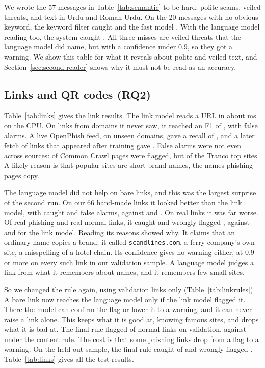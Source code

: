 We wrote the 57 messages in Table~\ref{tab:semantic} to be hard: polite scams, veiled threats, and text in Urdu and Roman Urdu. On the 20 messages with no obvious keyword, the keyword filter caught \plainKeyword{} and the fast model \plainFast{}. With the language model reading too, the system caught \plainBoth{}. All three misses are veiled threats that the language model did name, but with a confidence under 0.9, so they got a warning. We show this table for what it reveals about polite and veiled text, and Section~\ref{sec:second-reader} shows why it must not be read as an accuracy.

\subsection{Links and QR codes (RQ2)}
\label{sec:links}

Table~\ref{tab:links} gives the link results. The link model reads a URL in about \linkMs{} ms on the CPU. On \linkRows{} links from domains it never saw, it reached an F1 of \linkFone{}, with \linkFalseAlarm{} false alarms. A live OpenPhish feed, on unseen domains, gave a recall of \linkOpenphish{}, and a later fetch of links that appeared after training gave \linkOpenphishLater{}. False alarms were not even across sources: \linkCrawlFA{} of Common Crawl pages were flagged, but \linkTrancoFA{} of the Tranco top sites. A likely reason is that popular sites are short brand names, the names phishing pages copy.

The language model did not help on bare links, and this was the largest surprise of the second run. On our 66 hand-made links it looked better than the link model, with \fakeOldCaught{} caught and \fakeOldWrong{} false alarms, against \fakeLinkCaught{} and \fakeLinkWrong{}. On real links it was far worse. Of \linkSampleEach{} real phishing and \linkSampleEach{} real normal links, it caught \linkSampleCaught{} and wrongly flagged \linkSampleWrong{}, against \linkSampleFastCaught{} and \linkSampleFastWrong{} for the link model. Reading its reasons showed why. It claims that an ordinary name copies a brand: it called \texttt{scandlines.com}, a ferry company's own site, a misspelling of a hotel chain. Its confidence gives no warning either, at 0.9 or more on every such link in our validation sample. A language model judges a link from what it remembers about names, and it remembers few small sites.

So we changed the rule again, using validation links only (Table~\ref{tab:linkrules}). A bare link now reaches the language model only if the link model flagged it. There the model can confirm the flag or lower it to a warning, and it can never raise a link alone. This keeps what it is good at, knowing famous sites, and drops what it is bad at. The final rule flagged  of  normal links on validation, against  under the content rule. The cost is that some phishing links drop from a flag to a warning. On the held-out sample, the final rule caught \linkFinalCaught{} of \linkSampleEach{} and wrongly flagged \linkFinalWrong{}. Table~\ref{tab:links} gives all the test results.

